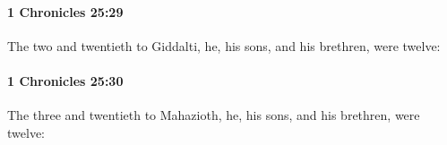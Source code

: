 		\paragraph{1 Chronicles 25:29} %
			\label{1CHRONICLES-25-29}

			The two and twentieth to Giddalti, he, his sons, and his brethren, were twelve:


		\paragraph{1 Chronicles 25:30} %
			\label{1CHRONICLES-25-30}

			The three and twentieth to Mahazioth, he, his sons, and his brethren, were twelve:


